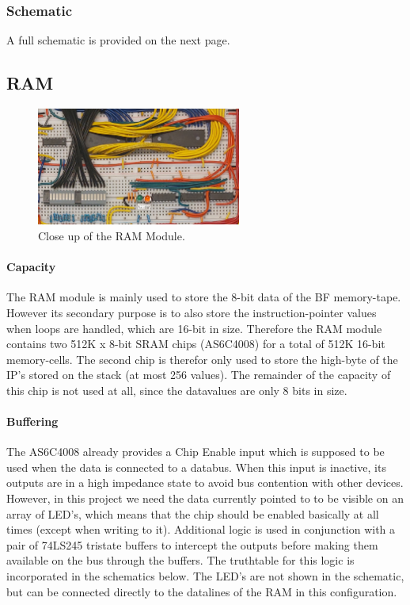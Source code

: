 \subsubsection{Schematic}
A full schematic is provided on the next page.




\subsection{RAM}
\begin{figure}[H]
  \centering
  \includegraphics[width=0.6\textwidth]{img/ramcloseup}
  \caption{Close up of the RAM Module.}
  \label{fig:ramcloseup}
\end{figure}

\paragraph{Capacity} The RAM module is mainly used to store the 8-bit data of the BF memory-tape. However its secondary purpose is to also store the instruction-pointer values when loops are handled, which are 16-bit in size. Therefore the RAM module contains two 512K x 8-bit SRAM chips (AS6C4008) for a total of 512K 16-bit memory-cells. The second chip is therefor only used to store the high-byte of the IP's stored on the stack (at most 256 values). The remainder of the capacity of this chip is not used at all, since the datavalues are only 8 bits in size.

\paragraph{Buffering} The AS6C4008 already provides a Chip Enable input which is supposed to be used when the data is connected to a databus. When this input is inactive, its outputs are in a high impedance state to avoid bus contention with other devices. However, in this project we need the data currently pointed to to be visible on an array of LED's, which means that the chip should be enabled basically at all times (except when writing to it). Additional logic is used in conjunction with a pair of 74LS245 tristate buffers to intercept the outputs before making them available on the bus through the buffers. The truthtable for this logic is incorporated in the schematics below. The LED's are not shown in the schematic, but can be connected directly to the datalines of the RAM in this configuration. 

